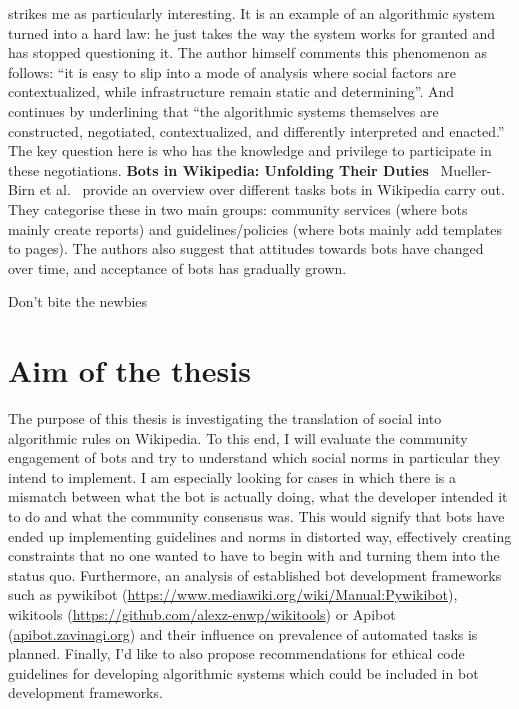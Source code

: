 \documentclass[pdftex,a4paper,11pt]{scrartcl}
\begin{document}
strikes me as particularly interesting.
It is an example of an algorithmic system turned into a hard law: he just takes the way the system works for granted and has stopped questioning it.
The author himself comments this phenomenon as follows:
``it is easy to slip into a mode of analysis where social factors are contextualized, while infrastructure remain static and determining''.
And continues by underlining that ``the algorithmic systems themselves are constructed, negotiated, contextualized, and differently interpreted and enacted.''
The key question here is who has the knowledge and privilege to participate in these negotiations.
\newline
\newline
\textbf{Bots in Wikipedia: Unfolding Their Duties}~\cite{MuellerBirn2014}
\newline
\newline
Mueller-Birn et al.~\cite{MuellerBirn2014} provide an overview over different tasks bots in Wikipedia carry out.
They categorise these in two main groups: community services (where bots mainly create reports) and guidelines/policies (where bots mainly add templates to pages).
The authors also suggest that attitudes towards bots have changed over time, and acceptance of bots has gradually grown.


\cite{HalKitRied2011}
Don't bite the newbies


\section{Aim of the thesis}
The purpose of this thesis is investigating the translation of social into algorithmic rules on Wikipedia.
To this end, I will evaluate the community engagement of bots and try to understand which social norms in particular they intend to implement.
I am especially looking for cases in which there is a mismatch between what the bot is actually doing, what the developer intended it to do and what the community consensus was.
This would signify that bots have ended up implementing guidelines and norms in distorted way, effectively creating constraints that no one wanted to have to begin with and turning them into the status quo.
Furthermore, an analysis of established bot development frameworks such as pywikibot (\url{https://www.mediawiki.org/wiki/Manual:Pywikibot}), wikitools (\url{https://github.com/alexz-enwp/wikitools}) or Apibot (\url{apibot.zavinagi.org}) and their influence on prevalence of automated tasks is planned.
Finally, I'd like to also propose recommendations for ethical code guidelines for developing algorithmic systems which could be included in bot development frameworks.
\end{document}
